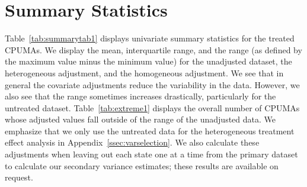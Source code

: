 \section{Summary Statistics}\label{sec:appendixsumstat}

Table~\ref{tab:summarytab1} displays univariate summary statistics for the treated CPUMAs. We display the mean, interquartile range, and the range (as defined by the maximum value minus the minimum value) for the unadjusted dataset, the heterogeneous adjustment, and the homogeneous adjustment. We see that in general the covariate adjustments reduce the variability in the data. However, we also see that the range sometimes increases drastically, particularly for the untreated dataset. Table~\ref{tab:extreme1} displays the overall number of CPUMAs whose adjusted values fall outside of the range of the unadjusted data. We emphasize that we only use the untreated data for the heterogeneous treatment effect analysis in Appendix~\ref{ssec:varselection}. We also calculate these adjustments when leaving out each state one at a time from the primary dataset to calculate our secondary variance estimates; these results are available on request. 

